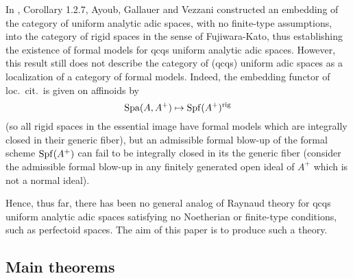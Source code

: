 \documentclass[12pt,twoside,a4paper]{article}
\theoremstyle{definition}
\theoremstyle{remark}
\newcommand\rig{{\rm rig}}
\newcommand\Spa{{\rm Spa}}
\newcommand\Spf{{\rm Spf}}
\begin{document}
In \cite{AGV}, Corollary 1.2.7, Ayoub, Gallauer and Vezzani constructed an embedding of the category of uniform analytic adic spaces, with no finite-type assumptions, into the category of rigid spaces in the sense of Fujiwara-Kato, thus establishing the existence of formal models for qcqs uniform analytic adic spaces. However, this result still does not describe the category of (qcqs) uniform adic spaces as a localization of a category of formal models. Indeed, the embedding functor of loc.~cit.~is given on affinoids by \begin{equation*}\Spa(A, A^{+})\mapsto \Spf(A^{+})^{\rig}\end{equation*}(so all rigid spaces in the essential image have formal models which are integrally closed in their generic fiber), but an admissible formal blow-up of the formal scheme $\Spf(A^{+})$ can fail to be integrally closed in its the generic fiber (consider the admissible formal blow-up in any finitely generated open ideal of $A^{+}$ which is not a normal ideal).

Hence, thus far, there has been no general analog of Raynaud theory for qcqs uniform analytic adic spaces satisfying no Noetherian or finite-type conditions, such as perfectoid spaces. The aim of this paper is to produce such a theory.

\subsection{Main theorems}       
\end{document}
